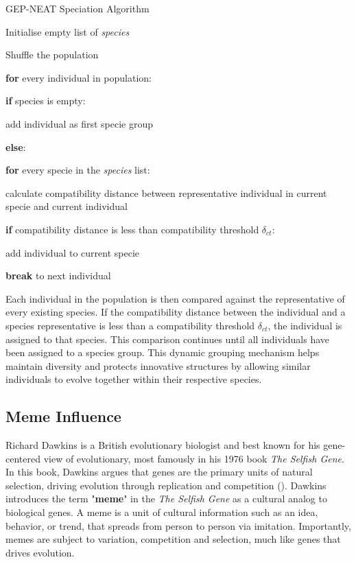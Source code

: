 \parbreak
\begin{algorithm}[H]
	\caption{GEP-NEAT Speciation Algorithm}\label{alg:speciation_2}
	\begin{algorithmic}[1]
	\item Initialise empty list of \textit{species}
	\item Shuffle the population
	\item \textbf{for} every individual in population:
	\item \quad \textbf{if} species is empty:
	\item \quad \quad add individual as first specie group
	\item \quad \textbf{else}:
	\item \quad \quad \textbf{for} every specie in the \textit{species} list:
	\item \quad \quad \quad calculate compatibility distance between representative individual in current specie and current individual
	\item \quad \quad \quad \textbf{if} compatibility distance is less than compatibility threshold $\delta_{ct}$:
	\item \quad \quad \quad \quad add individual to current specie
	\item \quad \quad \quad \quad \textbf{break} to next individual
\end{algorithmic}
\end{algorithm}

\parbreak\noindent Each individual in the population is then compared against the representative of every existing species. If the compatibility distance between the individual and a species representative is less than a compatibility threshold $\delta_{ct}$, the individual is assigned to that species. This comparison continues until all individuals have been assigned to a species group. This dynamic grouping mechanism helps maintain diversity and protects innovative structures by allowing similar individuals to evolve together within their respective species.

\subsection{Meme Influence}
Richard Dawkins is a British evolutionary biologist and best known for his gene-centered view of evolutionary, most famously in his 1976 book \textit{The Selfish Gene}. In this book, Dawkins argues that genes are the primary units of natural selection, driving evolution through replication and competition (\cite{dawkins1981selfish}). Dawkins introduces the term "\textbf{meme}" in the \textit{The Selfish Gene} as a cultural analog to biological genes. A meme is a unit of cultural information such as an idea, behavior, or trend, that spreads from person to person via imitation. Importantly, memes are subject to variation, competition and selection, much like genes that drives evolution. \bigskip

